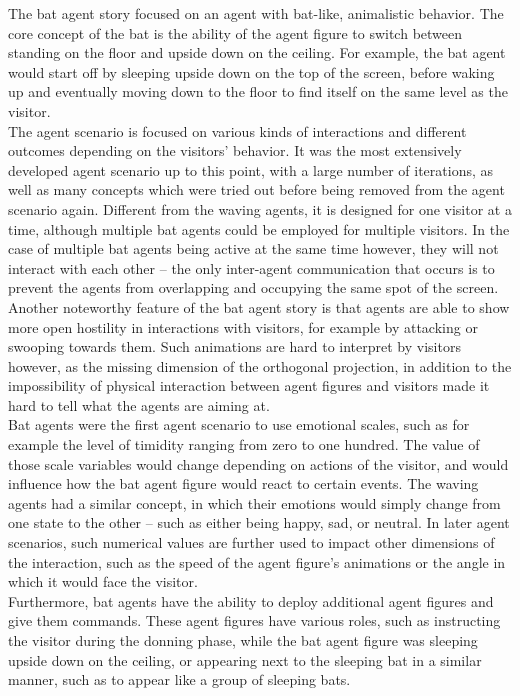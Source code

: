 \documentclass[draft,final]{vutinfth} %
\begin{document}
The bat agent story focused on an agent with bat-like, animalistic behavior. 
The core concept of the bat is the ability of the agent figure to switch between standing on the floor and upside down on the ceiling. 
For example, the bat agent would start off by sleeping upside down on the top of the screen, before waking up and eventually moving down to the floor to find itself on the same level as the visitor. \\
The agent scenario is focused on various kinds of interactions and different outcomes depending on the visitors’ behavior. 
It was the most extensively developed agent scenario up to this point, with a large number of iterations, as well as many concepts which were tried out before being removed from the agent scenario again. 
Different from the waving agents, it is designed for one visitor at a time, although multiple bat agents could be employed for multiple visitors. 
In the case of multiple bat agents being active at the same time however, they will not interact with each other – the only inter-agent communication that occurs is to prevent the agents from overlapping and occupying the same spot of the screen. \\
Another noteworthy feature of the bat agent story is that agents are able to show more open hostility in interactions with visitors, for example by attacking or swooping towards them. 
Such animations are hard to interpret by visitors however, as the missing dimension of the orthogonal projection, in addition to the impossibility of physical interaction between agent figures and visitors made it hard to tell what the agents are aiming at. \\
Bat agents were the first agent scenario to use emotional scales, such as for example the level of timidity ranging from zero to one hundred. 
The value of those scale variables would change depending on actions of the visitor, and would influence how the bat agent figure would react to certain events. 
The waving agents had a similar concept, in which their emotions would simply change from one state to the other – such as either being happy, sad, or neutral. 
In later agent scenarios, such numerical values are further used to impact other dimensions of the interaction, such as the speed of the agent figure’s animations or the angle in which it would face the visitor. \\
Furthermore, bat agents have the ability to deploy additional agent figures and give them commands. 
These agent figures have various roles, such as instructing the visitor during the donning phase, while the bat agent figure was sleeping upside down on the ceiling, or appearing next to the sleeping bat in a similar manner, such as to appear like a group of sleeping bats. \\
\end{document}
